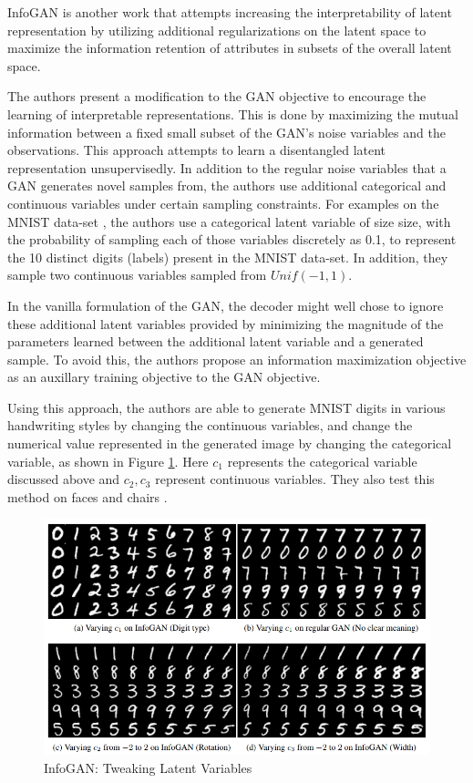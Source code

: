InfoGAN \citep{chen2016infogan} is another work that attempts increasing the interpretability of latent representation by utilizing additional regularizations on the latent space to maximize the information retention of attributes in subsets of the overall latent space.

The authors present a modification to the GAN objective \citep{goodfellow2014generative} to encourage the learning of interpretable representations. This is done by maximizing the
mutual information between a fixed small subset of the GAN's noise variables and the observations. This approach attempts to learn a disentangled latent representation unsupervisedly. In addition to the regular noise variables that a GAN generates novel samples from, the authors use additional categorical and continuous variables under certain sampling constraints. For examples on the MNIST data-set \citep{lecun2010mnist}, the authors use a categorical latent variable of size size, with the probability of sampling each of those variables discretely as 0.1, to represent the 10 distinct digits (labels) present in the MNIST data-set. In addition, they sample two continuous variables sampled from $Unif(-1, 1)$.

In the vanilla formulation of the GAN, the decoder might well chose to ignore these additional latent variables provided by minimizing the magnitude of the parameters learned between the additional latent variable and a generated sample. To avoid this, the authors propose an information maximization objective as an auxillary training objective to the GAN objective.

Using this approach, the authors are able to generate MNIST digits in various handwriting styles by changing the continuous variables, and change the numerical value represented in the generated image by changing the categorical variable, as shown in Figure \ref{fig:images/infogan-digits}. Here $c_1$ represents the categorical variable discussed above and $c_2, c_3$ represent continuous variables. They also test this method on faces \citep{liu2015deep,paysan20093d} and chairs \citep{aubry2014seeing}.

\begin{figure}[ht]
	\centering
	\includegraphics[width=\textwidth]{images/infogan-digits}
	\caption{\label{fig:images/infogan-digits} InfoGAN: Tweaking Latent Variables}
\end{figure}

